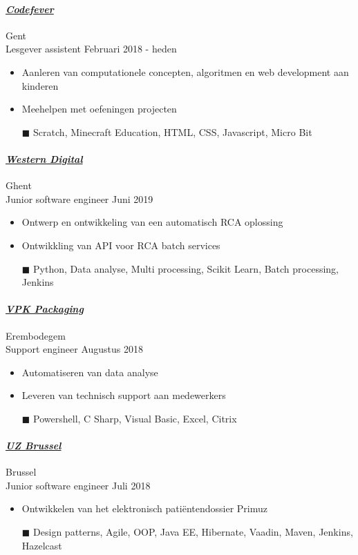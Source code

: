 \documentclass[a4paper, twoside]{article}
\begin{document}
\paragraph{\textbf{\textit{\href{https://codefever.be }{\textcolor{blueDark}{ Codefever }}}}} \hfill\small Gent \\
Lesgever assistent \hfill\small
Februari 2018
- heden
\begin{itemize}
\itemsep-0.2em
\item Aanleren van computationele concepten, algoritmen en web development aan kinderen
\item Meehelpen met oefeningen projecten
\item[\color{orange}$\blacksquare$] Scratch, Minecraft Education, HTML, CSS, Javascript, Micro Bit
\end{itemize}
\paragraph{\textbf{\textit{\href{https://westerndigital.com }{\textcolor{blueDark}{ Western Digital }}}}} \hfill\small Ghent \\
Junior software engineer \hfill\small
Juni 2019
\begin{itemize}
\itemsep-0.2em
\item Ontwerp en ontwikkeling van een automatisch RCA oplossing
\item Ontwikkling van API voor RCA batch services
\item[\color{orange}$\blacksquare$] Python, Data analyse, Multi processing, Scikit Learn, Batch processing, Jenkins
\end{itemize}
\paragraph{\textbf{\textit{\href{https://vpkgroup.com }{\textcolor{blueDark}{ VPK Packaging }}}}} \hfill\small Erembodegem \\
Support engineer \hfill\small
Augustus 2018
\begin{itemize}
\itemsep-0.2em
\item Automatiseren van data analyse
\item Leveren van technisch support aan medewerkers
\item[\color{orange}$\blacksquare$] Powershell, C Sharp, Visual Basic, Excel, Citrix
\end{itemize}
\paragraph{\textbf{\textit{\href{https://uzbrussel.be }{\textcolor{blueDark}{ UZ Brussel }}}}} \hfill\small Brussel \\
Junior software engineer \hfill\small
Juli 2018
\begin{itemize}
\itemsep-0.2em
\item Ontwikkelen van het elektronisch patiëntendossier Primuz
\item[\color{orange}$\blacksquare$] Design patterns, Agile, OOP, Java EE, Hibernate, Vaadin, Maven, Jenkins, Hazelcast
\end{itemize}
\end{document}
